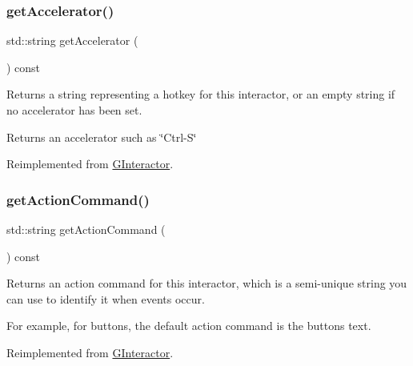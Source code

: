 \subsubsection{\texorpdfstring{get\+Accelerator()}{getAccelerator()}}
{\footnotesize\ttfamily std\+::string get\+Accelerator (\begin{DoxyParamCaption}{ }\end{DoxyParamCaption}) const\hspace{0.3cm}{\ttfamily [virtual]}}



Returns a string representing a hotkey for this interactor, or an empty string if no accelerator has been set. 

\begin{DoxyReturn}{Returns}
an accelerator such as \char`\"{}\+Ctrl-\/\+S\char`\"{} 
\end{DoxyReturn}


Reimplemented from \mbox{\hyperlink{classGInteractor_a69f8d23ed8f207fbecad99960776e942}{G\+Interactor}}.

\mbox{\label{classGButton_a90f2b1e6f6e7dabd9d6e5307f7c6d1b7}} 
\subsubsection{\texorpdfstring{get\+Action\+Command()}{getActionCommand()}}
{\footnotesize\ttfamily std\+::string get\+Action\+Command (\begin{DoxyParamCaption}{ }\end{DoxyParamCaption}) const\hspace{0.3cm}{\ttfamily [virtual]}}



Returns an action command for this interactor, which is a semi-\/unique string you can use to identify it when events occur. 

For example, for buttons, the default action command is the button\textquotesingle{}s text. 

Reimplemented from \mbox{\hyperlink{classGInteractor_a94eb4276000c4fdfb508ce9e6317a82a}{G\+Interactor}}.

\mbox{\label{classGInteractor_a808e22cc1fdfbecf71ed8c64ef4600e0}} 
